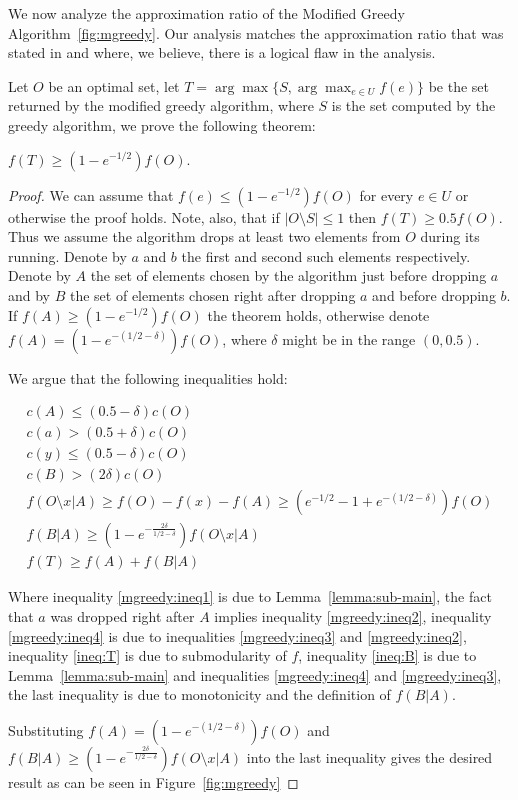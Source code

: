 We now analyze the approximation ratio of the
Modified Greedy Algorithm~\ref{fig:mgreedy}.
Our analysis matches the approximation ratio that was stated in
\cite{khuller1999budgeted} and \cite{krause2005note} where, we believe, 
there is a logical flaw in the analysis.


Let $O$ be an optimal set, let $T = \arg\max\{S, \displaystyle{\arg\max_{e \in U}}f(e)\}$
be the set returned by the modified greedy algorithm,
where $S$ is the set computed by the greedy algorithm,
we prove the following theorem:

\begin{theorem}
	$f(T) \geq (1 - e^{-1/2})f(O)$.
\end{theorem}

\begin{proof}
	We can assume that $f(e) \leq (1 - e^{-1/2})f(O)$ for every $e \in U$ or otherwise the proof holds.
	Note, also, that if $|O \setminus S| \leq 1$ then $f(T) \geq 0.5f(O)$.
	Thus we assume the algorithm drops at least two elements from $O$ during its running.
	Denote by $a$ and $b$ the first and second such elements respectively.
	Denote by $A$ the set of elements chosen by the algorithm just before dropping $a$ and by
	$B$ the set of elements chosen right after dropping $a$ and before dropping $b$.
	If $f(A) \geq (1 - e^{-1/2})f(O)$ the theorem holds, otherwise denote $f(A) = (1 - e^{-(1/2 - \delta)})f(O)$,
	where $\delta$ might be in the range $(0, 0.5)$.

	We argue that the following inequalities hold:

	\begin{align}
		\label{mgreedy:ineq1}
		c(A) \leq (0.5 - \delta)c(O)
		\\
		\label{mgreedy:ineq2}
		c(a) > (0.5 + \delta)c(O)
		\\
		\label{mgreedy:ineq3}
		c(y) \leq (0.5 - \delta)c(O)
		\\
		\label{mgreedy:ineq4}
		c(B) > (2\delta)c(O)
		\\
		\label{ineq:T}
		f(O \setminus x | A) \geq f(O) - f(x) - f(A) \geq (e^{-1/2} - 1 + e^{-(1/2 - \delta)})f(O)
		\\
		\label{ineq:B}
		f(B|A) \geq (1 - e^{-\frac{2\delta}{1/2 - \delta}})f(O \setminus x | A)
		\\
		f(T) \geq f(A) + f(B|A)
	\end{align}

	Where inequality \ref{mgreedy:ineq1} is due to Lemma~\ref{lemma:sub-main},
	the fact that $a$ was dropped right after $A$ implies inequality \ref{mgreedy:ineq2},
	inequality \ref{mgreedy:ineq4} is due to inequalities \ref{mgreedy:ineq3} and
	\ref{mgreedy:ineq2},
	inequality \ref{ineq:T} is due to submodularity of $f$,
	inequality \ref{ineq:B} is due to Lemma~\ref{lemma:sub-main} and inequalities
	\ref{mgreedy:ineq4} and \ref{mgreedy:ineq3},
	the last inequality is due to monotonicity and the definition of $f(B|A)$.

	Substituting $f(A) = (1 - e^{-(1/2 - \delta)})f(O)$
	and $f(B|A) \geq (1 - e^{-\frac{2\delta}{1/2 - \delta}})f(O \setminus x | A)$
	into the last inequality gives the desired result as can be seen in Figure~\ref{fig:mgreedy}
\end{proof}

